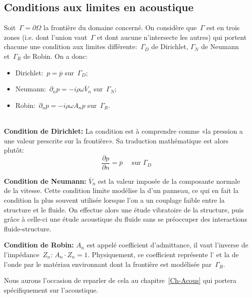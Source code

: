 \subsection{Conditions aux limites en acoustique}
Soit~$\Gamma=\partial\Omega$ la frontière du domaine concerné. On considère que~$\Gamma$ est  en trois zones (i.e. dont l'union vaut~$\Gamma$ et dont aucune n'intersecte les autres) qui portent chacune une condition aux limites différente:~$\Gamma_D$ de Dirichlet, $\Gamma_N$ de Neumann et~$\Gamma_R$ de Robin.
\medskipvm
On a donc:
\begin{itemize}
  \item Dirichlet:~$p=\overline{p}$ sur~$\Gamma_D$;\\[-2ex]
  \item Neumann:~$\partial_n p = -i\rho\omega \overline{V}_n$ sur~$\Gamma_N$;\\[-2ex]
  \item Robin:~$\partial_n p=-i\rho\omega A_n p$ sur~$\Gamma_R$.
\end{itemize}
\begin{remarque}[Remarques]~\\
\textbf{Condition de Dirichlet:}
La condition est à comprendre comme «la pression a une valeur prescrite sur la frontière». 
Sa traduction mathématique est alors plutôt:
\begin{equation*}
\dfrac{\partial p}{\partial n} = \overline{p} \quad \text{ sur } \Gamma_D
\end{equation*}

\noindent\textbf{Condition de Neumann:}
$\overline{V}_n$ est la valeur imposée de la composante normale de la vitesse. Cette condition limite modélise la  d'un panneau, ce qui en fait la condition la plus souvent utilisée lorsque l'on a un couplage faible entre la structure et le fluide. On effectue alors une étude vibratoire de la structure, puis grâce à celle-ci une étude acoustique du fluide sans se préoccuper des interactions fluide-structure.

\noindent\textbf{Condition de Robin:}
$A_n$ est appelé coefficient d'admittance, il vaut l'inverse de l'impédance~$Z_n$:
$A_n\cdot Z_n=1$. Physiquement, ce coefficient représente l' et la  de l'onde par le matériau environnant dont la frontière est modélisée par~$\Gamma_R$.
\end{remarque}
Nous aurons l'occasion de reparler de cela au chapitre~\ref{Ch-Acous} qui portera spécifiquement sur l'acoustique.

